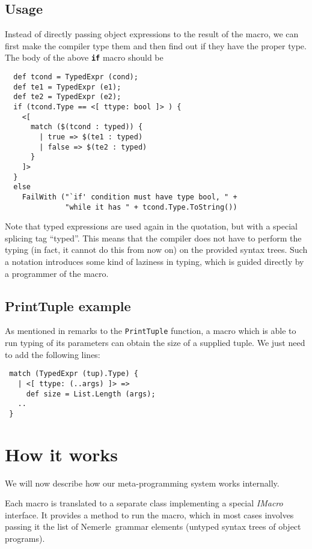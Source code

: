\documentclass{llncs}
\newcommand{\nem}[0]{Nemerle}
\newcommand{\kw}[1]{{\tt \bf #1}}
\begin{document}
\subsection{Usage}
Instead of directly passing object expressions to the result of the macro, we
can first make the compiler type them and then find out if they have the proper
type. The body of the above \kw{if} macro should be

\begin{verbatim}
  def tcond = TypedExpr (cond);
  def te1 = TypedExpr (e1);
  def te2 = TypedExpr (e2);
  if (tcond.Type == <[ ttype: bool ]> ) {
    <[ 
      match ($(tcond : typed)) { 
        | true => $(te1 : typed) 
        | false => $(te2 : typed) 
      } 
    ]>
  }
  else
    FailWith ("`if' condition must have type bool, " +
              "while it has " + tcond.Type.ToString())
\end{verbatim}

Note that typed expressions are used again in the quotation, but with a special 
splicing tag ``typed''. This means that the compiler does not have to perform the 
typing (in fact, it cannot do this from now on) on the provided syntax trees. 
Such a notation introduces some kind of laziness in typing, which is guided
directly by a programmer of the macro.

\subsection{PrintTuple example}
As mentioned in remarks to the \verb,PrintTuple, function, a macro which is able to run 
typing of its parameters can obtain the size of a supplied tuple. We just need to add
the following lines:

\begin{verbatim}
 match (TypedExpr (tup).Type) {
   | <[ ttype: (..args) ]> =>
     def size = List.Length (args);
   ..
 }
\end{verbatim}

\section{How it works}
We will now describe how our meta-programming system works internally. 

Each macro is translated to a separate class implementing a special
\emph{IMacro} interface. It provides a method to run the macro, which
in most cases involves passing it the list of \nem\ grammar elements
(untyped syntax trees of object programs).
\end{document}
